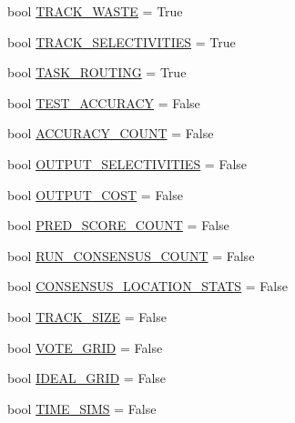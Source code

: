 \begin{DoxyCompactItemize}
\item 
bool \mbox{\hyperlink{namespacedynamicfilterapp_1_1toggles_ab80874aebf30b9d13f7928d5ecbd6ae2}{T\+R\+A\+C\+K\+\_\+\+W\+A\+S\+TE}} = True
\item 
bool \mbox{\hyperlink{namespacedynamicfilterapp_1_1toggles_acc098c8abb66db6192e90e5b54413c39}{T\+R\+A\+C\+K\+\_\+\+S\+E\+L\+E\+C\+T\+I\+V\+I\+T\+I\+ES}} = True
\item 
bool \mbox{\hyperlink{namespacedynamicfilterapp_1_1toggles_a267ac7f08878f62c6031a8fb38aa695b}{T\+A\+S\+K\+\_\+\+R\+O\+U\+T\+I\+NG}} = True
\item 
bool \mbox{\hyperlink{namespacedynamicfilterapp_1_1toggles_a899bd5bdb20b1d0a0592390572cc4e87}{T\+E\+S\+T\+\_\+\+A\+C\+C\+U\+R\+A\+CY}} = False
\item 
bool \mbox{\hyperlink{namespacedynamicfilterapp_1_1toggles_ae898ca1b1c4681151406ecc2921a738b}{A\+C\+C\+U\+R\+A\+C\+Y\+\_\+\+C\+O\+U\+NT}} = False
\item 
bool \mbox{\hyperlink{namespacedynamicfilterapp_1_1toggles_ac8f124f313b63d29e1664ff5fc7a049f}{O\+U\+T\+P\+U\+T\+\_\+\+S\+E\+L\+E\+C\+T\+I\+V\+I\+T\+I\+ES}} = False
\item 
bool \mbox{\hyperlink{namespacedynamicfilterapp_1_1toggles_a2c3c37ecd0a669270751ba1fcdc0439f}{O\+U\+T\+P\+U\+T\+\_\+\+C\+O\+ST}} = False
\item 
bool \mbox{\hyperlink{namespacedynamicfilterapp_1_1toggles_a28f8ae2e702ca2e2112db9629538fc72}{P\+R\+E\+D\+\_\+\+S\+C\+O\+R\+E\+\_\+\+C\+O\+U\+NT}} = False
\item 
bool \mbox{\hyperlink{namespacedynamicfilterapp_1_1toggles_ab852b5e6373777202ed3eabdf511f026}{R\+U\+N\+\_\+\+C\+O\+N\+S\+E\+N\+S\+U\+S\+\_\+\+C\+O\+U\+NT}} = False
\item 
bool \mbox{\hyperlink{namespacedynamicfilterapp_1_1toggles_ad7f3dbdec359eb538bf1890793d541ad}{C\+O\+N\+S\+E\+N\+S\+U\+S\+\_\+\+L\+O\+C\+A\+T\+I\+O\+N\+\_\+\+S\+T\+A\+TS}} = False
\item 
bool \mbox{\hyperlink{namespacedynamicfilterapp_1_1toggles_a2051e4cd9bae895351ea7a73696fd815}{T\+R\+A\+C\+K\+\_\+\+S\+I\+ZE}} = False
\item 
bool \mbox{\hyperlink{namespacedynamicfilterapp_1_1toggles_abd2acb6c03d6ca650537592475fc69e4}{V\+O\+T\+E\+\_\+\+G\+R\+ID}} = False
\item 
bool \mbox{\hyperlink{namespacedynamicfilterapp_1_1toggles_a42311c82a77ac3b1c03bf7b9c6619be2}{I\+D\+E\+A\+L\+\_\+\+G\+R\+ID}} = False
\item 
bool \mbox{\hyperlink{namespacedynamicfilterapp_1_1toggles_a3dd608f63971ae7536ce7be96396c510}{T\+I\+M\+E\+\_\+\+S\+I\+MS}} = False

\end{DoxyCompactItemize}

